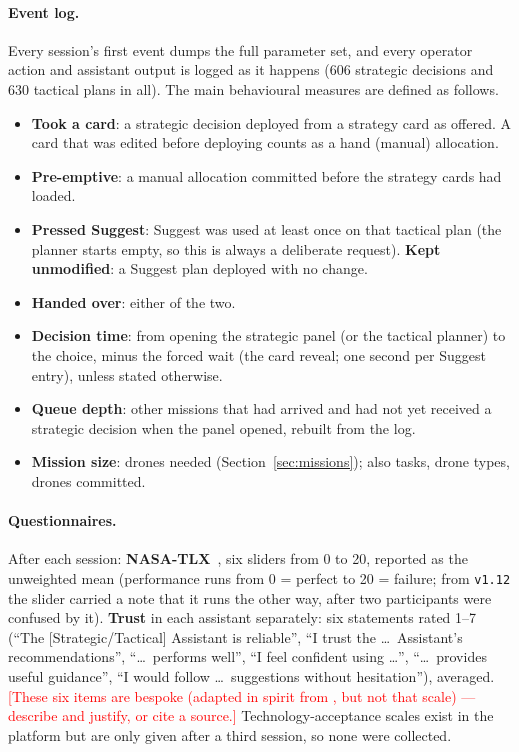 \documentclass[10pt]{article}
\theoremstyle{definition}
\newcommand{\todo}[1]{\textcolor{red}{[#1]}}
\begin{document}
\paragraph{Event log.} Every session's first event dumps the full parameter set, and every operator action and
assistant output is logged as it happens (606 strategic decisions and 630 tactical plans in all). The main
behavioural measures are defined as follows.
\begin{itemize}[noitemsep]
  \item \textbf{Took a card}: a strategic decision deployed from a strategy card as offered. A card that was edited
        before deploying counts as a hand (manual) allocation.
  \item \textbf{Pre-emptive}: a manual allocation committed before the strategy cards had loaded.
  \item \textbf{Pressed Suggest}: Suggest was used at least once on that tactical plan (the planner starts empty, so
        this is always a deliberate request). \textbf{Kept unmodified}: a Suggest plan deployed with no change.
  \item \textbf{Handed over}: either of the two.
  \item \textbf{Decision time}: from opening the strategic panel (or the tactical planner) to the choice, minus the
        forced wait (the card reveal; one second per Suggest entry), unless stated otherwise.
  \item \textbf{Queue depth}: other missions that had arrived and had not yet received a strategic decision when the
        panel opened, rebuilt from the log.
  \item \textbf{Mission size}: drones needed (Section~\ref{sec:missions}); also tasks, drone types, drones committed.
\end{itemize}

\paragraph{Questionnaires.} After each session: \textbf{NASA-TLX}~\cite{hart1988nasa}, six sliders from 0 to 20,
reported as the unweighted mean (performance runs from 0 = perfect to 20 = failure; from \texttt{v1.12} the slider
carried a note that it runs the other way, after two participants were confused by it). \textbf{Trust} in each
assistant separately: six statements rated 1--7 (``The [Strategic/Tactical] Assistant is reliable'', ``I trust the
\dots\ Assistant's recommendations'', ``\dots\ performs well'', ``I feel confident using \dots'', ``\dots\ provides
useful guidance'', ``I would follow \dots\ suggestions without hesitation''), averaged. \todo{These six items are
bespoke (adapted in spirit from \cite{jian2000foundations}, but not that scale) --- describe and justify, or cite a
source.} Technology-acceptance scales exist in the platform but are only given after a third session, so none were
collected.
\end{document}
